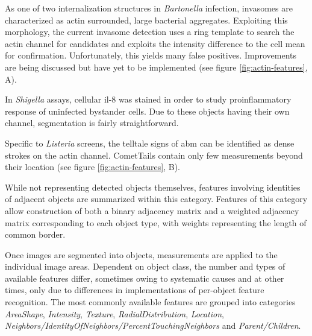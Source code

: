 \begin{description}[leftmargin=0.5cm]
\item[Invasomes:] As one of two internalization structures in \textit{Bartonella} infection, invasomes are characterized as actin surrounded, large bacterial aggregates. Exploiting this morphology, the current invasome detection uses a ring template to search the actin channel for candidates and exploits the intensity difference to the cell mean for confirmation. Unfortunately, this yields many false positives. Improvements are being discussed but have yet to be implemented (see figure \ref{fig:actin-features}, A).
\item[IL8:] In \textit{Shigella} assays, cellular \gls{il-8} was stained in order to study proinflammatory response of uninfected bystander cells. Due to these objects having their own channel, segmentation is fairly straightforward.
\item[CometTails:] Specific to \textit{Listeria} screens, the telltale signs of \gls{abm} can be identified as dense strokes on the actin channel. CometTails contain only few measurements beyond their location (see figure \ref{fig:actin-features}, B).
\item[Neighbors:] While not representing detected objects themselves, features involving identities of adjacent objects are summarized within this category.  Features of this category allow construction of both a binary adjacency matrix and a weighted adjacency matrix corresponding to each object type, with weights representing the length of common border.
\end{description}

Once images are segmented into objects, measurements are applied to the individual image areas. Dependent on object class, the number and types of available features differ, sometimes owing to systematic causes and at other times, only due to differences in implementations of per-object feature recognition. The most commonly available features are grouped into categories \textit{AreaShape}, \textit{Intensity}, \textit{Texture}, \textit{RadialDistribution}, \textit{Location}, \textit{Neighbors\slash IdentityOfNeighbors\slash Per\-centTouchingNeighbors} and \textit{Parent\slash Children}.

